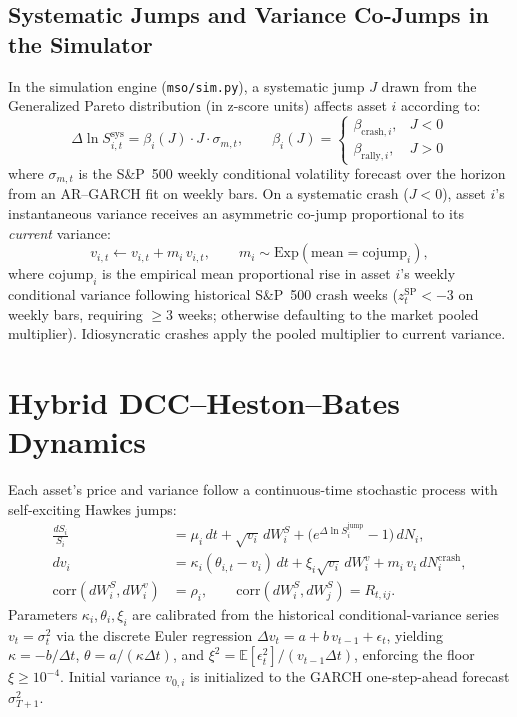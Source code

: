 \documentclass[11pt]{article}
\newcommand{\E}{\mathbb{E}}
\begin{document}
\subsection{Systematic Jumps and Variance Co-Jumps in the Simulator}
In the simulation engine (\texttt{mso/sim.py}), a systematic jump $J$ drawn from the Generalized Pareto
distribution (in z-score units) affects asset $i$ according to:
\begin{equation}
\Delta \ln S_{i, t}^{\mathrm{sys}} = \beta_i(J) \cdot J \cdot \sigma_{m, t}, \qquad
\beta_i(J) = \begin{cases} \beta_{\mathrm{crash}, i}, & J < 0 \\ \beta_{\mathrm{rally}, i}, & J > 0 \end{cases}
\end{equation}
where $\sigma_{m, t}$ is the S\&P~500 weekly conditional volatility forecast over the horizon from an $\mathrm{AR}\text{--}\mathrm{GARCH}$
fit on weekly bars. On a systematic crash ($J < 0$), asset $i$'s instantaneous variance receives an asymmetric
co-jump proportional to its \emph{current} variance:
\begin{equation}
v_{i, t} \leftarrow v_{i, t} + m_i\,v_{i, t}, \qquad m_i \sim \mathrm{Exp}(\mathrm{mean} = \mathrm{cojump}_i),
\end{equation}
where $\mathrm{cojump}_i$ is the empirical mean proportional rise in asset $i$'s weekly conditional variance following
historical S\&P~500 crash weeks ($z_t^{\mathrm{SP}} < -3$ on weekly bars, requiring $\ge 3$ weeks; otherwise
defaulting to the market pooled multiplier). Idiosyncratic crashes apply the pooled multiplier to current variance.

\section{Hybrid DCC--Heston--Bates Dynamics}\label{sec:heston}
Each asset's price and variance follow a continuous-time stochastic process with self-exciting Hawkes jumps:
\begin{align}
\frac{dS_i}{S_i} &= \mu_i\,dt + \sqrt{v_i}\,dW^{S}_i + \Big(e^{\Delta \ln S_i^{\mathrm{jump}}}-1\Big)\,dN_i, \\
dv_i &= \kappa_i(\theta_{i,t} - v_i)\,dt + \xi_i\sqrt{v_i}\,dW^{v}_i + m_i\,v_i\,dN^{\mathrm{crash}}_i, \\
\mathrm{corr}(dW^{S}_i, dW^{v}_i) &= \rho_i, \qquad \mathrm{corr}(dW^{S}_i, dW^{S}_j) = R_{t,ij}.
\end{align}
Parameters $\kappa_i, \theta_i, \xi_i$ are calibrated from the historical conditional-variance series $v_t = \sigma_t^2$
via the discrete Euler regression $\Delta v_t = a + b\,v_{t-1} + \epsilon_t$, yielding $\kappa = -b/\Delta t$,
$\theta = a/(\kappa\Delta t)$, and $\xi^2 = \E[\epsilon_t^2] / (v_{t-1}\Delta t)$, enforcing the floor $\xi \ge 10^{-4}$.
Initial variance $v_{0, i}$ is initialized to the GARCH one-step-ahead forecast $\sigma_{T+1}^2$.
\end{document}
